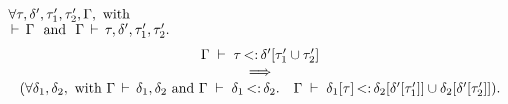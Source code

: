 \begin{lemma}%
\label{lem:sub-inner-union-right:app}
    $\forall \tau, \delta', \tau'_1, \tau'_2, \Gamma, \text{ with }$\\
    $\tyvld{}{\AEnv}\ \text{ and }\ \tyvlddflt{\ty, \dctx', \ty'_1, \ty'_2}.$
    \[
        \begin{array}{ccc}
        \Gamma\;\vdash\;\tau \operatorname{<:} \delta'[\tau'_1 \cup \tau'_2]\\
        \quad\implies\quad\\
        (\forall \delta_1, \delta_2, \text{ with }
        \Gamma\,\vdash\,\delta_1, \delta_2 \text{ and }
        \Gamma\;\vdash\;\delta_1 \operatorname{<:} \delta_2.\quad
        \Gamma\;\vdash\;\delta_1[\tau] \operatorname{<:} \delta_2[\delta'[\tau'_1]] \cup \delta_2[\delta'[\tau'_2]]
            ).
        \end{array}
    \]
\end{lemma}
